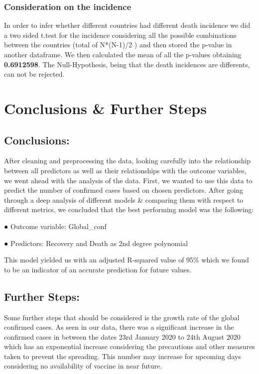 \documentclass[11pt]{article}
\begin{document}
\hypertarget{consideration-on-the-incidence}{%
\subsubsection{Consideration on the
incidence}\label{consideration-on-the-incidence}}

In order to infer whether different countries had different death
incidence we did a two sided t.test for the incidence considering all
the possible combinations between the countries (total of N*(N-1)/2 )
and then stored the p-value in another dataframe. We then calculated the
mean of all the p-values obtaining \textbf{0.6912598}. The
Null-Hypothesis, being that the death incidences are differents, can not
be rejected.

\hypertarget{conclusions-further-steps}{%
\section{Conclusions \& Further Steps}\label{conclusions-further-steps}}

\hypertarget{conclusions}{%
\subsection{Conclusions:}\label{conclusions}}

After cleaning and preprocessing the data, looking carefully into the
relationship between all predictors as well as their relationships with
the outcome variables, we went ahead with the analysis of the data.
First, we wanted to use this data to predict the number of confirmed
cases based on chosen predictors. After going through a deep analysis of
different models \& comparing them with respect to different metrics, we
concluded that the best performing model was the following:

● Outcome variable: Global\_conf

● Predictors: Recovery and Death as 2nd degree polynomial

This model yielded us with an adjusted R-squared value of 95\% which we
found to be an indicator of an accurate prediction for future values.

\hypertarget{further-steps}{%
\subsection{Further Steps:}\label{further-steps}}

Some further steps that should be considered is the growth rate of the
global confirmed cases. As seen in our data, there was a significant
increase in the confirmed cases in between the dates 23rd January 2020
to 24th August 2020 which has an exponential increase considering the
precautions and other measures taken to prevent the spreading. This
number may increase for upcoming days considering no availability of
vaccine in near future.
\end{document}
